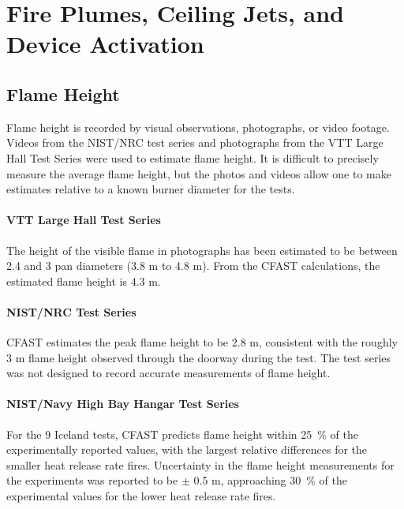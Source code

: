 
\chapter{Fire Plumes, Ceiling Jets, and Device Activation}

\section{Flame Height}

Flame height is recorded by visual observations, photographs, or video footage.  Videos from the NIST/NRC test series and photographs from the VTT Large Hall Test Series were used to estimate flame height.  It is difficult to precisely measure the average flame height, but the photos and videos allow one to make estimates relative to a known burner diameter for the tests.

\subsubsection{VTT Large Hall Test Series}

The height of the visible flame in  photographs has been estimated to be between 2.4 and 3 pan diameters (3.8 m to 4.8 m).  From the CFAST calculations, the estimated flame height is 4.3 m.

\subsubsection{NIST/NRC Test Series}

CFAST estimates the peak flame height to be 2.8 m, consistent with the roughly 3 m flame height observed through the doorway during the test.  The test series was not designed to record accurate measurements of flame height.

\subsubsection{NIST/Navy High Bay Hangar Test Series}

For the 9 Iceland tests, CFAST predicts flame height within 25~\% of the experimentally reported values, with the largest relative differences for the smaller heat release rate fires. Uncertainty in the flame height measurements for the experiments was reported to be $\pm$ 0.5 m, approaching 30~\% of the experimental values for the lower heat release rate fires.

